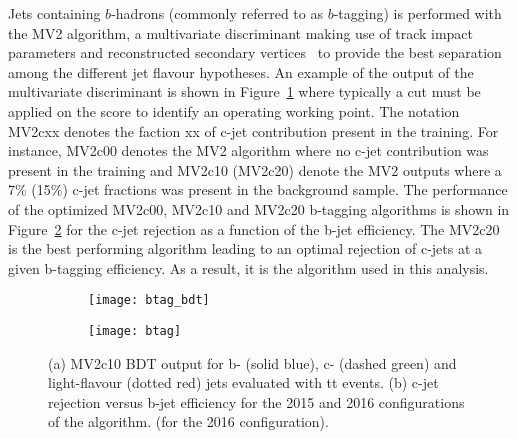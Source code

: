 Jets containing $b$-hadrons (commonly referred to as $b$-tagging) 
is performed with the MV2 algorithm, a multivariate discriminant making 
use of track impact parameters 
and reconstructed secondary vertices~\cite{Aad:2015ydr,ATL-PHYS-PUB-2015-022}
to provide the best separation among the different jet flavour hypotheses.
An example of the output of the multivariate discriminant is shown in Figure~\ref{fig:exp.btag.bdt} 
where typically a cut must be applied on the score to identify an operating working point. 
The notation MV2cxx denotes the faction xx of  c-jet contribution present in the training.
For instance, MV2c00 denotes the MV2 algorithm where no c-jet contribution was present in the training and MV2c10 (MV2c20) denote the MV2 outputs where a 7\% (15\%) c-jet fractions was present 
in the background sample.
The performance of the optimized  MV2c00, MV2c10 and MV2c20 b-tagging algorithms is shown in Figure~\ref{fig:exp.btag.eff}
for the c-jet rejection as a function of the b-jet efficiency.
The MV2c20 is the best performing algorithm leading to an optimal rejection of c-jets at a given b-tagging 
efficiency. As a result, it is the algorithm used in this analysis.


\begin{figure}[htb!]
\centering
\begin{subfigure}[t]{0.48\textwidth}
\texttt{[image: btag\_bdt]}
\subcaption{}
\label{fig:exp.btag.bdt}
\end{subfigure}
\begin{subfigure}[t]{0.48\textwidth}
\texttt{[image: btag]}
\subcaption{}
\label{fig:exp.btag.eff}
\end{subfigure}
\vspace{-0.25cm}
\caption{
(a) MV2c10 BDT output for b- (solid blue), c- (dashed green) and light-flavour (dotted red) jets evaluated with tt events. 
(b) c-jet rejection versus b-jet efficiency for the 2015 and 2016 configurations of the algorithm.
 (for the 2016 configuration). 
}
\label{fig:exp.btag}
\end{figure} 


